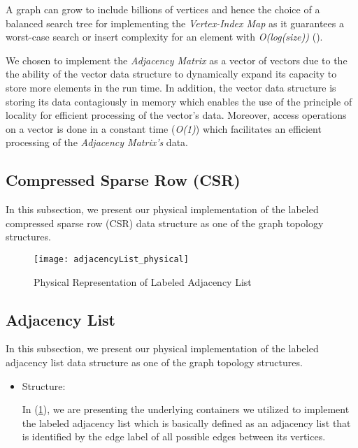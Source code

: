 {\begin{itemize}
A graph can grow to include billions of vertices and hence the choice of a balanced search tree for implementing the \textit{Vertex-Index Map} as it guarantees a worst-case search or insert complexity for an element with \textit{O(log(size))}
(\cite{NSA}).

We chosen to implement the \textit{Adjacency Matrix} as a vector of vectors due to the the ability of the vector data structure to dynamically expand its capacity to store more elements in the run time. In addition, the vector data structure is storing its data contagiously in memory which enables the use of the principle of locality for efficient processing of the vector's data. Moreover, access operations on a vector is done in a constant time (\textit{O(1)}) which facilitates an efficient processing of the \textit{Adjacency Matrix's} data.

\end{itemize}

\subsection{Compressed Sparse Row (CSR)}

In this subsection, we present our physical implementation of the labeled compressed sparse row (CSR) data structure as one of the graph topology structures.



\begin{figure}[ht]
\centering
\hspace*{-0.4in}
\texttt{[image: adjacencyList\_physical]}
\caption{Physical Representation of Labeled Adjacency List}
\label{fig_adjacencyList_physical}
\end{figure}


\subsection{Adjacency List}
\label{adjList_physical}

In this subsection, we present our physical implementation of the labeled adjacency list data structure as one of the graph topology structures.

\begin{itemize}

\item{Structure:}

In (\ref{fig_adjacencyList_physical}), we are presenting the underlying containers we utilized to implement the labeled adjacency list which is basically defined as an adjacency list that is identified by the edge label of all possible edges between its vertices.


\end{itemize}}

